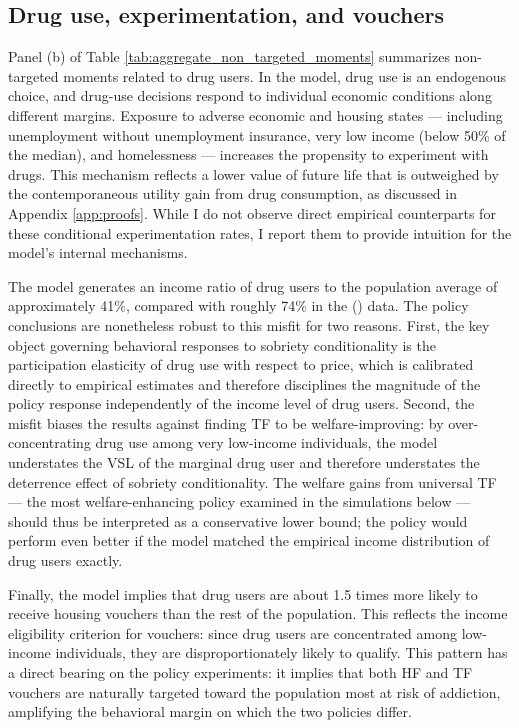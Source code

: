 \documentclass[parskip=full]{article}
\theoremstyle{plain}
\theoremstyle{definition}
\theoremstyle{remark}
\newcommand{\citetshort}[1]{\citetalias{#1} (\citeyear{#1})}
\begin{document}
\subsection{Drug use, experimentation, and vouchers}

Panel (b) of Table \ref{tab:aggregate_non_targeted_moments} summarizes non-targeted moments related to drug users. In the model, drug use is an endogenous choice, and drug-use decisions respond to individual economic conditions along different margins. Exposure to adverse economic and housing states — including unemployment without unemployment insurance, very low income (below 50\% of the median), and homelessness — increases the propensity to experiment with drugs. This mechanism reflects a lower value of future life that is outweighed by the contemporaneous utility gain from drug consumption, as discussed in Appendix \ref{app:proofs}. While I do not observe direct empirical counterparts for these conditional experimentation rates, I report them to provide intuition for the model’s internal mechanisms.

The model generates an income ratio of drug users to the population average of approximately 41\%, compared with roughly 74\% in the \citetshort{nsduh_2024} data. The policy conclusions are nonetheless robust to this misfit for two reasons. First, the key object governing behavioral responses to sobriety conditionality is the participation 
elasticity of drug use with respect to price, which is calibrated directly to empirical estimates and therefore disciplines the magnitude of the policy response independently of the income level of drug users. Second, the misfit biases the results against finding TF to be welfare-improving: by over-concentrating drug use among very low-income individuals, the model understates the VSL of the marginal drug user and therefore understates the deterrence effect of sobriety conditionality. The welfare gains from universal TF — the most welfare-enhancing policy examined in the simulations below — should thus be interpreted as a conservative lower bound; the policy would perform even better if the model matched the empirical income distribution of drug users exactly.

Finally, the model implies that drug users are about 1.5 times more likely to receive housing vouchers than the rest of the population. This reflects the income eligibility criterion for vouchers: since drug users are concentrated among low-income individuals, they are disproportionately likely to qualify. This pattern has a direct bearing on the policy experiments: it implies that both HF and TF 
vouchers are naturally targeted toward the population most at risk of addiction, amplifying the behavioral margin on which the two policies differ. 
\end{document}
